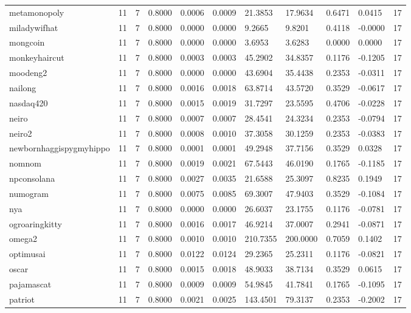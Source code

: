 \begin{table}[htbp]
\begin{tabular}{lllllllllll}
metamonopoly & 11 & 7 & 0.8000 & 0.0006 & 0.0009 & 21.3853 & 17.9634 & 0.6471 & 0.0415 & 17 \\
miladywifhat & 11 & 7 & 0.8000 & 0.0000 & 0.0000 & 9.2665 & 9.8201 & 0.4118 & -0.0000 & 17 \\
mongcoin & 11 & 7 & 0.8000 & 0.0000 & 0.0000 & 3.6953 & 3.6283 & 0.0000 & 0.0000 & 17 \\
monkeyhaircut & 11 & 7 & 0.8000 & 0.0003 & 0.0003 & 45.2902 & 34.8357 & 0.1176 & -0.1205 & 17 \\
moodeng2 & 11 & 7 & 0.8000 & 0.0000 & 0.0000 & 43.6904 & 35.4438 & 0.2353 & -0.0311 & 17 \\
nailong & 11 & 7 & 0.8000 & 0.0016 & 0.0018 & 63.8714 & 43.5720 & 0.3529 & -0.0617 & 17 \\
nasdaq420 & 11 & 7 & 0.8000 & 0.0015 & 0.0019 & 31.7297 & 23.5595 & 0.4706 & -0.0228 & 17 \\
neiro & 11 & 7 & 0.8000 & 0.0007 & 0.0007 & 28.4541 & 24.3234 & 0.2353 & -0.0794 & 17 \\
neiro2 & 11 & 7 & 0.8000 & 0.0008 & 0.0010 & 37.3058 & 30.1259 & 0.2353 & -0.0383 & 17 \\
newbornhaggispygmyhippo & 11 & 7 & 0.8000 & 0.0001 & 0.0001 & 49.2948 & 37.7156 & 0.3529 & 0.0328 & 17 \\
nomnom & 11 & 7 & 0.8000 & 0.0019 & 0.0021 & 67.5443 & 46.0190 & 0.1765 & -0.1185 & 17 \\
npconsolana & 11 & 7 & 0.8000 & 0.0027 & 0.0035 & 21.6588 & 25.3097 & 0.8235 & 0.1949 & 17 \\
numogram & 11 & 7 & 0.8000 & 0.0075 & 0.0085 & 69.3007 & 47.9403 & 0.3529 & -0.1084 & 17 \\
nya & 11 & 7 & 0.8000 & 0.0000 & 0.0000 & 26.6037 & 23.1755 & 0.1176 & -0.0781 & 17 \\
ogroaringkitty & 11 & 7 & 0.8000 & 0.0016 & 0.0017 & 46.9214 & 37.0007 & 0.2941 & -0.0871 & 17 \\
omega2 & 11 & 7 & 0.8000 & 0.0010 & 0.0010 & 210.7355 & 200.0000 & 0.7059 & 0.1402 & 17 \\
optimusai & 11 & 7 & 0.8000 & 0.0122 & 0.0124 & 29.2365 & 25.2311 & 0.1176 & -0.0821 & 17 \\
oscar & 11 & 7 & 0.8000 & 0.0015 & 0.0018 & 48.9033 & 38.7134 & 0.3529 & 0.0615 & 17 \\
pajamascat & 11 & 7 & 0.8000 & 0.0009 & 0.0009 & 54.9845 & 41.7841 & 0.1765 & -0.1095 & 17 \\
patriot & 11 & 7 & 0.8000 & 0.0021 & 0.0025 & 143.4501 & 79.3137 & 0.2353 & -0.2002 & 17 \\

\end{tabular}
\end{table}
